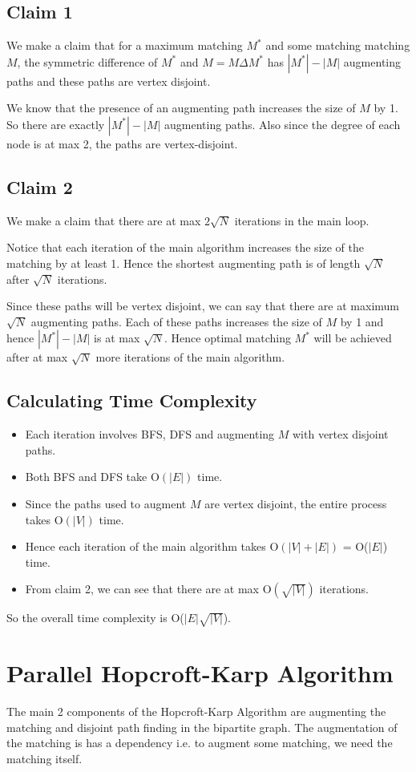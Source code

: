 \documentclass{article}
\begin{document}
\subsection{Claim 1}
We make a claim that for a maximum matching $M^*$ and some matching matching $M$, the symmetric difference of $M^*$ and $M = M \Delta M^*$ has $|M^*|-|M|$ augmenting paths and these paths are vertex disjoint. 

We know that the presence of an augmenting path increases the size of $M$ by 1. So there are exactly $|M^*|-|M|$ augmenting paths. Also since the degree of each node is at max 2, the paths are vertex-disjoint.

\subsection{Claim 2}
We make a claim that there are at max $2\sqrt{N}$ iterations in the main loop. 

Notice that each iteration of the main algorithm increases the size of the matching by at least 1. Hence the shortest augmenting path is of length $\sqrt{N}$ after $\sqrt{N}$ iterations.

Since these paths will be vertex disjoint, we can say that there are at maximum $\sqrt{N}$ augmenting paths. Each of these paths increases the size of $M$ by 1 and hence $|M^*|-|M|$ is at max $\sqrt{N}$. Hence optimal matching $M^*$ will be achieved after at max $\sqrt{N}$ more iterations of the main algorithm.

\subsection{Calculating Time Complexity}
\begin{itemize}
    \item Each iteration involves BFS, DFS and augmenting $M$ with vertex disjoint paths.
    \item Both BFS and DFS take O$(|E|)$ time.
    \item Since the paths used to augment $M$ are vertex disjoint, the entire process takes O$(|V|)$ time.
    \item Hence each iteration of the main algorithm takes O$(|V|+|E|)$ = O($|E|$) time.
    \item From claim 2, we can see that there are at max O$(\sqrt{|V|})$ iterations.
\end{itemize}
So the overall time complexity is O($|E|\sqrt{|V|}$).

\section{Parallel Hopcroft-Karp Algorithm}
The main 2 components of the Hopcroft-Karp Algorithm are augmenting the matching and disjoint path finding in the bipartite graph. The augmentation of the matching is has a dependency i.e. to augment some matching, we need the matching itself. 
\end{document}
